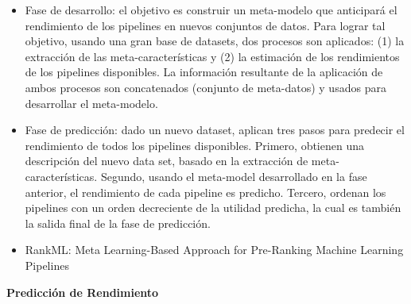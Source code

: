 \begin{itemize}
	\item Fase de desarrollo: el objetivo es construir un meta-modelo que anticipará el rendimiento de los pipelines en nuevos conjuntos de datos. Para lograr tal objetivo, usando una gran base de datasets, dos procesos son aplicados: (1) la extracción de las meta-características y (2) la estimación de los rendimientos de los pipelines disponibles. La información resultante de la aplicación de ambos procesos son concatenados (conjunto de meta-datos) y usados para desarrollar el meta-modelo.
	\item Fase de predicción: dado un nuevo dataset, aplican tres pasos para predecir el rendimiento de todos los pipelines disponibles. Primero, obtienen una descripción del nuevo data set, basado en la extracción de meta-características. Segundo, usando el meta-model desarrollado en la fase anterior, el rendimiento de cada pipeline es predicho. Tercero, ordenan los pipelines con un orden decreciente de la utilidad predicha, la cual es también la salida final de la fase de predicción.
\end{itemize}

\begin{itemize}
	\item RankML: Meta Learning-Based Approach for Pre-Ranking Machine Learning Pipelines
\end{itemize}

%
%

\quad

\textbf{Predicción de Rendimiento}


